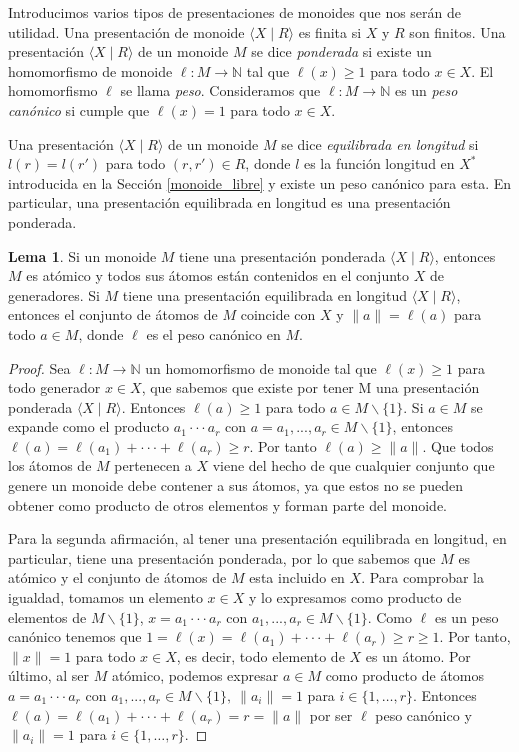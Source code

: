 \documentclass[12pt]{book}
\theoremstyle{definition}
\newtheorem{lema}{Lema}[section]
\providecommand{\norm}[1]{\lVert#1\rVert}
\begin{document}
Introducimos varios tipos de presentaciones de monoides que nos serán de utilidad. Una presentación de monoide $\langle X\mid R\rangle$ es finita si $X$ y $R$ son finitos. Una presentación $\langle X\mid R\rangle$ de un monoide $M$ se dice \textit{ponderada} si existe un homomorfismo de monoide $\ell:M\rightarrow \mathbb{N}$ tal que $\ell(x)\geq 1$ para todo $x\in X$. El homomorfismo $\ell$ se llama \textit{peso}. Consideramos que $\ell:M\rightarrow \mathbb{N}$ es un \textit{peso canónico} si cumple que $\ell(x)=1$ para todo $x\in X$.

Una presentación $\langle X\mid R\rangle$ de un monoide $M$ se dice \textit{equilibrada en longitud} si $l(r)=l(r')$ para todo $(r,r')\in R$, donde $l$ es la función longitud en $X^*$ introducida en la Sección \ref{monoide_libre} y existe un peso canónico para esta. En particular, una presentación equilibrada en longitud es una presentación ponderada.

\begin{lema}
Si un monoide $M$ tiene una presentación ponderada $\langle X\mid R\rangle$, entonces $M$ es atómico y todos sus átomos están contenidos en el conjunto $X$ de generadores. Si $M$ tiene una presentación equilibrada en longitud $\langle X\mid R\rangle$, entonces el conjunto de átomos de $M$ coincide con $X$ y $\norm{a}=\ell(a)$ para todo $a\in M$, donde $\ell$ es el peso canónico en $M$.
\label{lema:presen_mono}
\end{lema}

\begin{proof} Sea $\ell: M\rightarrow \mathbb{N}$ un homomorfismo de monoide tal que $\ell(x)\geq 1$ para todo generador $x\in X$, que sabemos que existe por tener M  una presentación ponderada $\langle X\mid R\rangle$. Entonces $\ell(a)\geq 1$ para todo $a\in M \backslash\{1\}$. Si $a\in M$ se expande como el producto $a_1\cdot\cdot\cdot a_r$ con $a = a_1,...,a_r\in M\backslash\{1\}$, entonces $\ell(a)=\ell(a_1)+\cdot\cdot\cdot+\ell(a_r)\geq r$. Por tanto $\ell(a)\geq \norm{a}$. Que todos los átomos de $M$ pertenecen a $X$ viene del hecho de que cualquier conjunto que genere un monoide debe contener a sus átomos, ya que estos no se pueden obtener como producto de otros elementos y forman parte del monoide. 

Para la segunda afirmación, al tener una presentación equilibrada en longitud, en particular, tiene una presentación ponderada, por lo que sabemos que $M$ es atómico y el conjunto de átomos de $M$ esta incluido en $X$. Para comprobar la igualdad, tomamos un elemento $x\in X$ y lo expresamos como producto de elementos de $M\backslash\{1\}$, $x = a_1\cdot\cdot\cdot a_r$ con $a_1,...,a_r\in M\backslash\{1\}$. Como $\ell$ es un peso canónico tenemos que $1=\ell(x)=\ell(a_1)+\cdot\cdot\cdot+\ell(a_r)\geq r\geq 1$. Por tanto, $\norm{x}=1$ para todo $x\in X$, es decir, todo elemento de $X$ es un átomo. Por último, al ser $M$ atómico, podemos expresar $a\in M$ como producto de átomos $a =a_1\cdot\cdot\cdot a_r$ con $a_1,...,a_r\in M\backslash\{1\},\ \norm{a_i}=1$  para $i\in\{1,\ldots,r\}$. Entonces $\ell(a)=\ell(a_1)+\cdot\cdot\cdot+\ell(a_r) = r = \norm{a}$ por ser $\ell$ peso canónico y $\norm{a_i}=1$ para $i\in\{1,\ldots,r\}$.
\end{proof}
\end{document}

